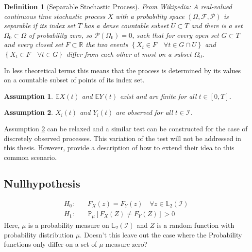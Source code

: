 \documentclass[12pt, a4paper]{article}
\theoremstyle{MAstyle} \newtheorem{assumption}{Assumption}[section]
\theoremstyle{MAstyle} \newtheorem{definition}{Definition}[section]
\begin{document}
			\begin{definition}[Separable Stochastic Process]
				{\color{red} From Wikipedia:} A real-valued continuous time stochastic process $X$ with a probability space $\left(\Omega, \mathcal{F}, \mathcal{P}\right)$ is separable if its index set $T$ has a dense countable subset $U \subset T$ and there is a set $\Omega_0 \subset \Omega$ of probability zero, so $\mathcal{P}\left(\Omega_0\right) = 0$, such that for every open set $G \subset T$ and every closed set $F \subset \mathbb{R}$ the two events $\left\{X_t \in F \quad \forall t \in G \cap U\right\}$ and $\left\{X_t \in F \quad \forall t \in G\right\}$ differ from each other at most on a subset $\Omega_0$.
			\end{definition}
		
			In less theoretical terms this means that the process is determined by its values on a countable subset of points of its index set.
		
			\begin{assumption}
				$\mathbb{E}X(t)$ and $\mathbb{E}Y(t)$ exist and are finite for all $t \in [0, T]$.
			\end{assumption}
		
			\begin{assumption}\label{continuous_observation}
				$X_i(t)$ and $Y_i(t)$ are observed for all $t \in \mathcal{I}$.
			\end{assumption}
			Assumption \ref{continuous_observation} can be relaxed and a similar test can be constructed for the case of discretely observed processes. This variation of the test will not be addressed in this thesis. However, \cite{bugni_permutation_2021} provide a description of how to extend their idea to this common scenario.
	
		\subsection{Nullhypothesis}
			\begin{equation}
				\begin{split}
					H_0: \quad &F_X(z) = F_Y(z) \quad \forall z \in \mathbb{L}_2(\mathcal{I}) \\
					H_1: \quad &\mathbb{P}_{\mu}\left[F_X(Z) \neq F_Y(Z)\right] > 0
				\end{split}
			\end{equation}
			Here, $\mu$ is a probability measure on $\mathbb{L}_2(\mathcal{I})$ and $Z$ is a random function with probability distribution $\mu$. {\color{red} Doesn't this leave out the case where the Probability functions only differ on a set of $\mu$-measure zero?}
		
\end{document}
